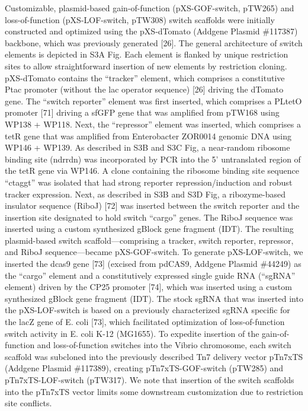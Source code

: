 Customizable, plasmid-based gain-of-function (pXS-GOF-switch, pTW265) and loss-of-function (pXS-LOF-switch, pTW308) switch scaffolds were initially constructed and optimized using the pXS-dTomato (Addgene Plasmid \#117387) backbone, which was previously generated [26]. The general architecture of switch elements is depicted in S3A Fig. Each element is flanked by unique restriction sites to allow straightforward insertion of new elements by restriction cloning. pXS-dTomato contains the ``tracker'' element, which comprises a constitutive Ptac promoter (without the lac operator sequence) [26] driving the dTomato gene. The ``switch reporter'' element was first inserted, which comprises a PLtetO promoter [71] driving a sfGFP gene that was amplified from pTW168 using WP138 + WP118. Next, the ``repressor'' element was inserted, which comprises a tetR gene that was amplified from Enterobacter ZOR0014 genomic DNA using WP146 + WP139. As described in S3B and S3C Fig, a near-random ribosome binding site (ndrrdn) was incorporated by PCR into the 5' untranslated region of the tetR gene via WP146. A clone containing the ribosome binding site sequence ``ctaggt'' was isolated that had strong reporter repression/induction and robust tracker expression. Next, as described in S3B and S3D Fig, a ribozyme-based insulator sequence (RiboJ) [72] was inserted between the switch reporter and the insertion site designated to hold switch ``cargo'' genes. The RiboJ sequence was inserted using a custom synthesized gBlock gene fragment (IDT). The resulting plasmid-based switch scaffold—comprising a tracker, switch reporter, repressor, and RiboJ sequence—became pXS-GOF-switch. To generate pXS-LOF-switch, we inserted the dcas9 gene [73] (excised from pdCAS9, Addgene Plasmid \#44249) as the ``cargo'' element and a constitutively expressed single guide RNA (``sgRNA'' element) driven by the CP25 promoter [74], which was inserted using a custom synthesized gBlock gene fragment (IDT). The stock sgRNA that was inserted into the pXS-LOF-switch is based on a previously characterized sgRNA specific for the lacZ gene of E. coli [73], which facilitated optimization of loss-of-function switch activity in E. coli K-12 (MG1655). To expedite insertion of the gain-of-function and loss-of-function switches into the Vibrio chromosome, each switch scaffold was subcloned into the previously described Tn7 delivery vector pTn7xTS (Addgene Plasmid \#117389), creating pTn7xTS-GOF-switch (pTW285) and pTn7xTS-LOF-switch (pTW317). We note that insertion of the switch scaffolds into the pTn7xTS vector limits some downstream customization due to restriction site conflicts.

